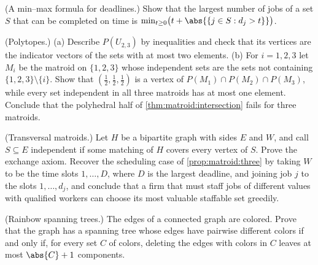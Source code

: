 \begin{refsection}
\begin{exercises}
\item \consolidation\hard\label{ex:matroid:schedule-rank} (A min--max formula for deadlines.) Show that the largest number of jobs of a set $S$ that can be completed on time is $\min_{t\ge0}\bigl(t+\abs{\{j\in S: d_j>t\}}\bigr)$. 

\item \consolidation\label{ex:matroid:polytope} (Polytopes.) (a) Describe $P(U_{2,3})$ by inequalities and check that its vertices are the indicator vectors of the sets with at most two elements. (b) For $i=1,2,3$ let $M_i$ be the matroid on $\{1,2,3\}$ whose independent sets are the sets not containing $\{1,2,3\}\setminus\{i\}$. Show that $(\frac12,\frac12,\frac12)$ is a vertex of $P(M_1)\cap P(M_2)\cap P(M_3)$, while every set independent in all three matroids has at most one element. Conclude that the polyhedral half of \cref{thm:matroid:intersection} fails for three matroids.

\item \transfer\hard\label{ex:matroid:transversal} (Transversal matroids.) Let $H$ be a bipartite graph with sides $E$ and $W$, and call $S\subseteq E$ independent if some matching of $H$ covers every vertex of $S$. Prove the exchange axiom. Recover the scheduling case of \cref{prop:matroid:three} by taking $W$ to be the time slots $1,\dots,D$, where $D$ is the largest deadline, and joining job $j$ to the slots $1,\dots,d_j$, and conclude that a firm that must staff jobs of different values with qualified workers can choose its most valuable staffable set greedily. 

\item \transfer\hard\label{ex:matroid:rainbow} (Rainbow spanning trees.) The edges of a connected graph are colored. Prove that the graph has a spanning tree whose edges have pairwise different colors if and only if, for every set $C$ of colors, deleting the edges with colors in $C$ leaves at most $\abs{C}+1$ components. 


\end{exercises}
\end{refsection}
